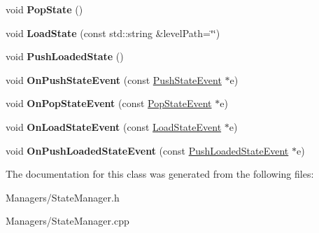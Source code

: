 \begin{DoxyCompactItemize}
void {\bfseries Pop\+State} ()
\item 
\mbox{\label{classStateManager_a7d0685d71de4237f8e5162b1a5008d71}} 
void {\bfseries Load\+State} (const std\+::string \&level\+Path=\char`\"{}\char`\"{})
\item 
\mbox{\label{classStateManager_ae296599b6c4332317d9ce844f5e3bad4}} 
void {\bfseries Push\+Loaded\+State} ()
\item 
\mbox{\label{classStateManager_a6183ca80b9da1ff95457d070565bfb72}} 
void {\bfseries On\+Push\+State\+Event} (const \hyperlink{classPushStateEvent}{Push\+State\+Event} $\ast$e)
\item 
\mbox{\label{classStateManager_ad50899842a3951f45bb6a0fd8d02742e}} 
void {\bfseries On\+Pop\+State\+Event} (const \hyperlink{classPopStateEvent}{Pop\+State\+Event} $\ast$e)
\item 
\mbox{\label{classStateManager_a133f491b1a698d5122c26f03fe16e3a7}} 
void {\bfseries On\+Load\+State\+Event} (const \hyperlink{classLoadStateEvent}{Load\+State\+Event} $\ast$e)
\item 
\mbox{\label{classStateManager_a08fd8358ae6f2258dfad8fce0b89a10a}} 
void {\bfseries On\+Push\+Loaded\+State\+Event} (const \hyperlink{classPushLoadedStateEvent}{Push\+Loaded\+State\+Event} $\ast$e)
\end{DoxyCompactItemize}


The documentation for this class was generated from the following files\+:\begin{DoxyCompactItemize}
\item 
Managers/State\+Manager.\+h\item 
Managers/State\+Manager.\+cpp\end{DoxyCompactItemize}
